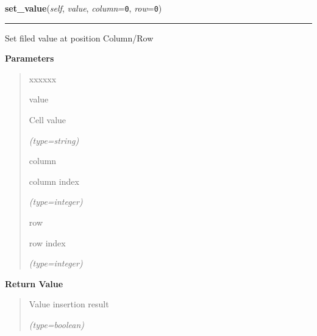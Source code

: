 \hspace{.8\funcindent}\begin{boxedminipage}{\funcwidth}

    \raggedright \textbf{set\_value}(\textit{self}, \textit{value}, \textit{column}={\tt 0}, \textit{row}={\tt 0})

    \vspace{-1.5ex}

    \rule{\textwidth}{0.5\fboxrule}
\setlength{\parskip}{2ex}
    Set filed value at position Column/Row

\setlength{\parskip}{1ex}
      \textbf{Parameters}
      \vspace{-1ex}

      \begin{quote}
        \begin{Ventry}{xxxxxx}

          \item[value]

          Cell value

            {\it (type=string)}

          \item[column]

          column index

            {\it (type=integer)}

          \item[row]

          row index

            {\it (type=integer)}

        \end{Ventry}

      \end{quote}

      \textbf{Return Value}
    \vspace{-1ex}

      \begin{quote}
      Value insertion result

      {\it (type=boolean)}

      \end{quote}

    \end{boxedminipage}

    \label{src:pylibratm:Field:value}

    \vspace{0.5ex}

